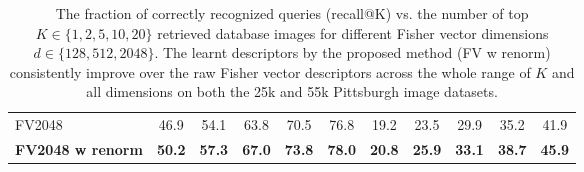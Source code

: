 \begin{table*}[t!]
\begin{centering}
\begin{tabularx}{0.68\linewidth}{|l|c c c c c|c c c c c|}
    \hline
		\rowcolor{maroon!10}
		FV2048        & 46.9  & 54.1 & 63.8 & 70.5 & 76.8 & 19.2 & 23.5 & 29.9 &  35.2 &  41.9 \\
		\rowcolor{maroon!10}
        \rowcolor{maroon!10}
        \textbf{FV2048 w renorm}  & \textbf{50.2} & \textbf{57.3} & \textbf{67.0} & \textbf{73.8} & \textbf{78.0} &
        \textbf{20.8} & \textbf{25.9} & \textbf{33.1} & \textbf{38.7} & \textbf{45.9}\\
        \hline
	\end{tabularx}
	\caption{ \textcolor{myRed}{}
The fraction of correctly recognized queries (recall@K) vs. the number of top $K\in\{1,2,5,10,20\}$ retrieved database images for different Fisher vector dimensions $d\in\{128,512,2048\}$. The learnt descriptors by the proposed method (FV w renorm) consistently improve over the raw Fisher vector descriptors across the whole range of $K$ and all dimensions on both the 25k and 55k Pittsburgh image datasets.		
}
\label{tab:recall}
\end{centering}
\end{table*}
